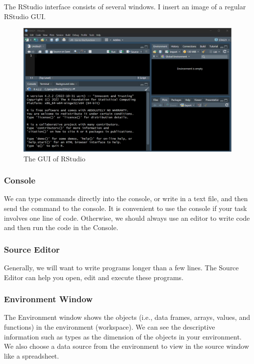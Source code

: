 \documentclass[
]{book}
\begin{document}
The RStudio interface consists of several windows. I insert an image of a regular RStudio GUI.

\begin{figure}

{\centering \includegraphics[width=0.9\linewidth]{img00/01-rstudio} 

}

\caption{The GUI of RStudio}\label{fig:unnamed-chunk-3}
\end{figure}

\hypertarget{console}{%
\subsubsection{Console}\label{console}}

We can type commands directly into the console, or write in a text file, and then send the command to the console. It is convenient to use the console if your task involves one line of code. Otherwise, we should always use an editor to write code and then run the code in the Console.

\hypertarget{source-editor}{%
\subsubsection{Source Editor}\label{source-editor}}

Generally, we will want to write programs longer than a few lines. The Source Editor can help you open, edit and execute these programs.

\hypertarget{environment-window}{%
\subsubsection{Environment Window}\label{environment-window}}

The Environment window shows the objects (i.e., data frames, arrays, values, and functions) in the environment (workspace). We can see the descriptive information such as types as the dimension of the objects in your environment. We also choose a data source from the environment to view in the source window like a spreadsheet.
\end{document}
